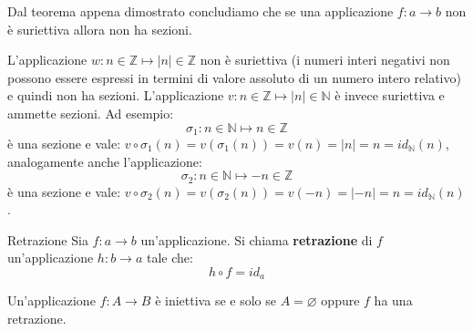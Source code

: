 \begin{osservation}
	Dal teorema appena dimostrato concludiamo che se una applicazione $f:a \longrightarrow b$ non è suriettiva allora non ha sezioni.
\end{osservation}

\begin{example}
	L'applicazione $w: n \in \mathbb{Z} \mapsto |n| \in \mathbb{Z}$ non è suriettiva (i numeri interi negativi non possono essere espressi in termini di valore assoluto di un numero intero relativo) e quindi non ha sezioni. L'applicazione $v: n \in \mathbb{Z} \mapsto |n| \in \mathbb{N}$ è invece suriettiva e ammette sezioni. Ad esempio:
	\begin{displaymath}
		\sigma_{1}: n \in \mathbb{N} \mapsto n \in \mathbb{Z}
	\end{displaymath}
	è una sezione e vale: $v \circ \sigma_{1}(n)=v(\sigma_{1}(n))=v(n)=|n|=n=id_{\mathbb{N}}(n)$, analogamente anche l'applicazione:
	\begin{displaymath}
		\sigma_{2}: n \in \mathbb{N} \mapsto -n \in \mathbb{Z}
	\end{displaymath}
	è una sezione e vale: $v \circ \sigma_{2}(n)=v(\sigma_{2}(n))=v(-n)=|-n|=n=id_{\mathbb{N}}(n)$.
\end{example}

\begin{defbox}{Retrazione}
	Sia $f: a \longrightarrow b$ un'applicazione. Si chiama \textbf{retrazione} di $f$ un'applicazione $h: b \longrightarrow a$ tale che:
	\begin{equation}
		h \circ f = id_{a}
	\end{equation}
\end{defbox}

\begin{teorbox}\label{thm:car_iniettive}
	Un'applicazione $f: A \rightarrow B$ è iniettiva se e solo se $A=\varnothing$ oppure $f$ ha una retrazione.
\end{teorbox}

